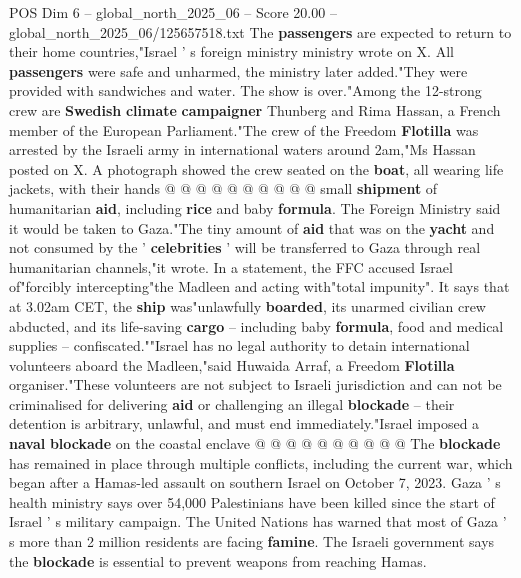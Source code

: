 \begin{textsample}{POS Dim 6 – global\_north\_2025\_06 – Score 20.00 – global\_north\_2025\_06/125657518.txt}
The \textbf{passengers} are expected to return to their home countries,"Israel ' s foreign ministry ministry wrote on X.
All \textbf{passengers} were safe and unharmed, the ministry later added."They were provided with sandwiches and water.
The show is over."Among the 12-strong crew are \textbf{Swedish} \textbf{climate} \textbf{campaigner} Thunberg and Rima Hassan, a French member of the European Parliament."The crew of the Freedom \textbf{Flotilla} was arrested by the Israeli army in international waters around 2am,"Ms Hassan posted on X.
A photograph showed the crew seated on the \textbf{boat}, all wearing life jackets, with their hands @ @ @ @ @ @ @ @ @ @ small \textbf{shipment} of humanitarian \textbf{aid}, including \textbf{rice} and baby \textbf{formula}.
The Foreign Ministry said it would be taken to Gaza."The tiny amount of \textbf{aid} that was on the \textbf{yacht} and not consumed by the ' \textbf{celebrities} ' will be transferred to Gaza through real humanitarian channels,"it wrote.
In a statement, the FFC accused Israel of"forcibly intercepting"the Madleen and acting with"total impunity".
It says that at 3.02am CET, the \textbf{ship} was"unlawfully \textbf{boarded}, its unarmed civilian crew abducted, and its life-saving \textbf{cargo} -- including baby \textbf{formula}, food and medical supplies -- confiscated.""Israel has no legal authority to detain international volunteers aboard the Madleen,"said Huwaida Arraf, a Freedom \textbf{Flotilla} organiser."These volunteers are not subject to Israeli jurisdiction and can not be criminalised for delivering \textbf{aid} or challenging an illegal \textbf{blockade} -- their detention is arbitrary, unlawful, and must end immediately."Israel imposed a \textbf{naval} \textbf{blockade} on the coastal enclave @ @ @ @ @ @ @ @ @ @ The \textbf{blockade} has remained in place through multiple conflicts, including the current war, which began after a Hamas-led assault on southern Israel on October 7, 2023.
Gaza ' s health ministry says over 54,000 Palestinians have been killed since the start of Israel ' s military campaign.
The United Nations has warned that most of Gaza ' s more than 2 million residents are facing \textbf{famine}.
The Israeli government says the \textbf{blockade} is essential to prevent weapons from reaching Hamas.

\end{textsample}
